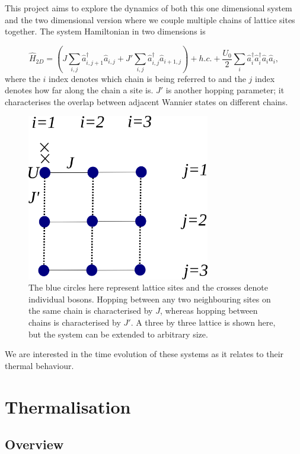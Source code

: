 \documentclass[a4paper,10pt]{article}
\begin{document}
This project aims to explore the dynamics of both this one dimensional system and the two dimensional version where we couple multiple chains of lattice sites together. The 
system Hamiltonian in two dimensions is
 
\begin{equation}
\hat{H}_{2D}=(J\sum_{i,j}\hat{a}^\dagger_{i,j+1}\hat{a}_{i,j} + J'\sum_{i,j}\hat{a}^\dagger_{i,j}\hat{a}_{i+1,j})+h.c. +\frac{U_0}{2}\sum_{i}\hat{a}^\dagger_{i}\hat{a}^\dagger_{i}\hat{a}_{i}\hat{a}_{i},
\end{equation}
where the $i$ index denotes which chain is being referred to and the $j$ index denotes how far along the chain a site is. $J'$ is another hopping parameter; it characterises the 
overlap between adjacent Wannier states on different chains.
\begin{figure}[H]
 \begin{center}
   \includegraphics[width=8cm]{lattice_pic}
 \end{center}
 \caption{The blue circles here represent lattice sites and the crosses denote individual bosons. Hopping between any two neighbouring sites on the same chain is characterised by $J$, whereas hopping 
 between chains is characterised by $J'$. A three by three lattice is shown here, but the system can be extended to arbitrary size.}
 \end{figure}

 
We are interested in the time evolution of these systems as it relates to their thermal behaviour.

\newpage
\section{Thermalisation}
 \subsection{Overview}
 
\end{document}
